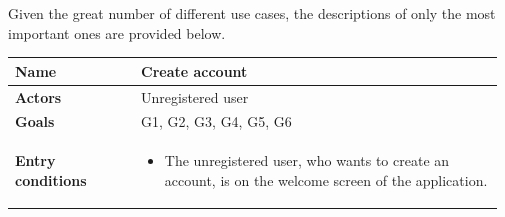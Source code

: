 
Given the great number of different use cases, the descriptions of only the most important ones are provided below.

\begin{longtable}{@{}p{0.25\linewidth} p{0.72\linewidth}@{}}
	\toprule
	\textbf{Name}               & Create account \\
	\midrule
	\textbf{Actors}             & Unregistered user \\
	\midrule
	\textbf{Goals}              & G1, G2, G3, G4, G5, G6 \\
	\midrule
	
	\textbf{Entry conditions}   & \begin{itemize}[leftmargin=.4cm,noitemsep,topsep=0pt,before=\vspace{-3mm},after=\vspace{-4mm}]
	    \item The unregistered user, who wants to create an account, is  on the welcome screen of the application.
	\end{itemize}\\
	\midrule
	

\end{longtable}
